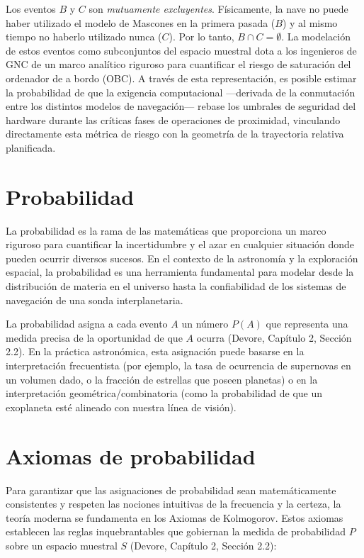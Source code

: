 Los eventos $B$ y $C$ son \textit{mutuamente excluyentes}. Físicamente, la nave no puede haber utilizado el modelo de Mascones en la primera pasada ($B$) y al mismo tiempo no haberlo utilizado nunca ($C$). Por lo tanto, $B \cap C = \emptyset$. La modelación de estos eventos como subconjuntos del espacio muestral dota a los ingenieros de GNC de un marco analítico riguroso para cuantificar el riesgo de saturación del ordenador de a bordo (OBC). A través de esta representación, es posible estimar la probabilidad de que la exigencia computacional —derivada de la conmutación entre los distintos modelos de navegación— rebase los umbrales de seguridad del hardware durante las críticas fases de operaciones de proximidad, vinculando directamente esta métrica de riesgo con la geometría de la trayectoria relativa planificada.

\section{Probabilidad}

La probabilidad es la rama de las matemáticas que proporciona un marco riguroso para cuantificar la incertidumbre y el azar en cualquier situación donde pueden ocurrir diversos sucesos. En el contexto de la astronomía y la exploración espacial, la probabilidad es una herramienta fundamental para modelar desde la distribución de materia en el universo hasta la confiabilidad de los sistemas de navegación de una sonda interplanetaria. 

La probabilidad asigna a cada evento $A$ un número $P(A)$ que representa una medida precisa de la oportunidad de que $A$ ocurra (Devore, Capítulo 2, Sección 2.2). En la práctica astronómica, esta asignación puede basarse en la interpretación frecuentista (por ejemplo, la tasa de ocurrencia de supernovas en un volumen dado, o la fracción de estrellas que poseen planetas) o en la interpretación geométrica/combinatoria (como la probabilidad de que un exoplaneta esté alineado con nuestra línea de visión). 

\section{Axiomas de probabilidad}

Para garantizar que las asignaciones de probabilidad sean matemáticamente consistentes y respeten las nociones intuitivas de la frecuencia y la certeza, la teoría moderna se fundamenta en los Axiomas de Kolmogorov. Estos axiomas establecen las reglas inquebrantables que gobiernan la medida de probabilidad $P$ sobre un espacio muestral $S$ (Devore, Capítulo 2, Sección 2.2):

